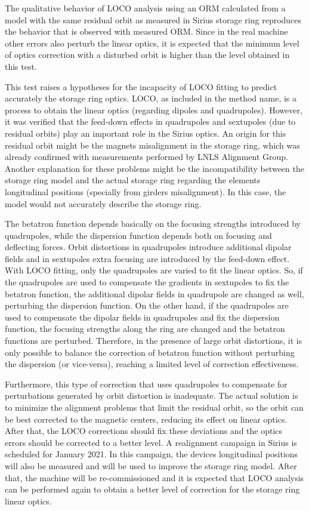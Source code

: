 The qualitative behavior of LOCO analysis using an ORM calculated from a model with the same residual orbit as measured in Sirius storage ring reproduces the behavior that is observed with measured ORM. Since in the real machine other errors also perturb the linear optics, it is expected that the minimum level of optics correction with a disturbed orbit is higher than the level obtained in this test. 

This test raises a hypotheses for the incapacity of LOCO fitting to predict accurately the storage ring optics. LOCO, as included in the method name, is a process to obtain the linear optics (regarding dipoles and quadrupoles). However, it was verified that the feed-down effects in quadrupoles and sextupoles (due to residual orbits) play an important role in the Sirius optics. An origin for this residual orbit might be the magnets misalignment in the storage ring, which was already confirmed with measurements performed by LNLS Alignment Group. Another explanation for these problems might be the incompatibility between the storage ring model and the actual storage ring regarding the elements longitudinal positions (specially from girders misalignment). In this case, the model would not accurately describe the storage ring.

The betatron function depends basically on the focusing strengths introduced by quadrupoles, while the dispersion function depends both on focusing and deflecting forces. Orbit distortions in quadrupoles introduce additional dipolar fields and in sextupoles extra focusing are introduced by the feed-down effect. With LOCO fitting, only the quadrupoles are varied to fit the linear optics. So, if the quadrupoles are used to compensate the gradients in sextupoles to fix the betatron function, the additional dipolar fields in quadrupole are changed as well, perturbing the dispersion function. On the other hand, if the quadrupoles are used to compensate the dipolar fields in quadrupoles and fix the dispersion function, the focusing strengths along the ring are changed and the betatron functions are perturbed. Therefore, in the presence of large orbit distortions, it is only possible to balance the correction of betatron function without perturbing the dispersion (or vice-versa), reaching a limited level of correction effectiveness.

Furthermore, this type of correction that uses quadrupoles to compensate for perturbations generated by orbit distortion is inadequate. The actual solution is to minimize the alignment problems that limit the residual orbit, so the orbit can be best corrected to the magnetic centers, reducing its effect on linear optics. After that, the LOCO corrections should fix these deviations and the optics errors should be corrected to a better level. A realignment campaign in Sirius is scheduled for January 2021. In this campaign, the devices longitudinal positions will also be measured and will be used to improve the storage ring model. After that, the machine will be re-commissioned and it is expected that LOCO analysis can be performed again to obtain a better level of correction for the storage ring linear optics.
